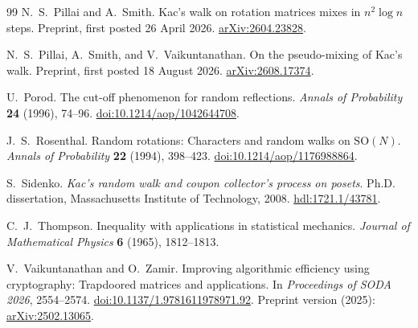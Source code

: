\documentclass[11pt]{article}
\theoremstyle{definition}\newtheorem{definition}[theorem]{Definition}
\theoremstyle{remark}\newtheorem{remark}[theorem]{Remark}
\begin{document}
\begin{thebibliography}{99}
 N.~S.~Pillai and A.~Smith.
Kac's walk on rotation matrices mixes in $n^2\log n$ steps.
Preprint, first posted 26 April 2026.
\href{https://arxiv.org/abs/2604.23828}{arXiv:2604.23828}.

 N.~S.~Pillai, A.~Smith, and V.~Vaikuntanathan.
On the pseudo-mixing of Kac's walk.
Preprint, first posted 18 August 2026.
\href{https://arxiv.org/abs/2608.17374}{arXiv:2608.17374}.

 U.~Porod.
The cut-off phenomenon for random reflections.
\emph{Annals of Probability} \textbf{24} (1996), 74--96.
\href{https://doi.org/10.1214/aop/1042644708}{doi:10.1214/aop/1042644708}.

 J.~S.~Rosenthal.
Random rotations: Characters and random walks on $\mathrm{SO}(N)$.
\emph{Annals of Probability} \textbf{22} (1994), 398--423.
\href{https://doi.org/10.1214/aop/1176988864}{doi:10.1214/aop/1176988864}.

 S.~Sidenko.
\emph{Kac's random walk and coupon collector's process on posets}.
Ph.D. dissertation, Massachusetts Institute of Technology, 2008.
\href{https://hdl.handle.net/1721.1/43781}{hdl:1721.1/43781}.

 C.~J.~Thompson.
Inequality with applications in statistical mechanics.
\emph{Journal of Mathematical Physics} \textbf{6} (1965), 1812--1813.

 V.~Vaikuntanathan and O.~Zamir.
Improving algorithmic efficiency using cryptography: Trapdoored matrices and applications.
In \emph{Proceedings of SODA 2026}, 2554--2574.
\href{https://doi.org/10.1137/1.9781611978971.92}{doi:10.1137/1.9781611978971.92}.
Preprint version (2025): \href{https://arxiv.org/abs/2502.13065}{arXiv:2502.13065}.
\end{thebibliography}
\end{document}
